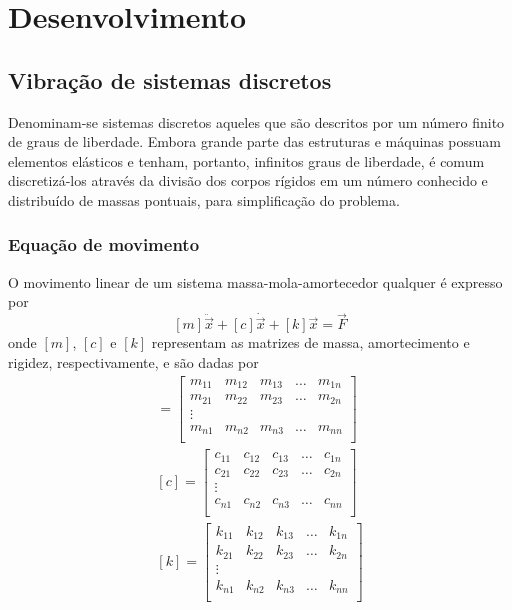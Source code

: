 \documentclass[12pt,openright,oneside,a4paper,
	chapter=TITLE,section=TITLE,
	english,brazil]{abntex2}
\begin{document}
	\chapter{Desenvolvimento}
	
	\section{Vibração de sistemas discretos}
	Denominam-se sistemas discretos aqueles que são descritos por um número finito de graus de liberdade. Embora grande parte das estruturas e máquinas possuam elementos elásticos e tenham, portanto, infinitos graus de liberdade, é comum discretizá-los através da divisão dos corpos rígidos em um número conhecido e distribuído de massas pontuais, para simplificação do problema. 
	
	\subsection{Equação de movimento}
	O movimento linear de um sistema massa-mola-amortecedor qualquer é expresso por \cite{rao:2008}
	\begin{equation} \label{eqn:discr:movimento}
		[m]\ddot{\vec{x}} + [c]\dot{\vec{x}} + [k]\vec{x} = \vec{F}
	\end{equation}
	onde $ [m] $, $ [c] $ e $ [k] $ representam as matrizes de massa, amortecimento e rigidez, respectivamente, e são dadas por
	\begin{gather} 
		[m] = 
		\begin{bmatrix} \label{eqn:matr:massa}
			m_{11} & m_{12} & m_{13} & \dots & m_{1n}\\
			m_{21} & m_{22} & m_{23} & \dots & m_{2n}\\
			\vdots\\
			m_{n1} & m_{n2} & m_{n3} & \dots & m_{nn}\\
		\end{bmatrix}\\		
		[c] = 
		\begin{bmatrix} \label{eqn:matr:amort}
			c_{11} & c_{12} & c_{13} & \dots & c_{1n}\\
			c_{21} & c_{22} & c_{23} & \dots & c_{2n}\\
			\vdots\\
			c_{n1} & c_{n2} & c_{n3} & \dots & c_{nn}\\
		\end{bmatrix}\\
		[k] = 
		\begin{bmatrix} \label{eqn:matr:rigid}
			k_{11} & k_{12} & k_{13} & \dots & k_{1n}\\
			k_{21} & k_{22} & k_{23} & \dots & k_{2n}\\
			\vdots\\
			k_{n1} & k_{n2} & k_{n3} & \dots & k_{nn}\\
		\end{bmatrix}
	\end{gather}
\end{document}
